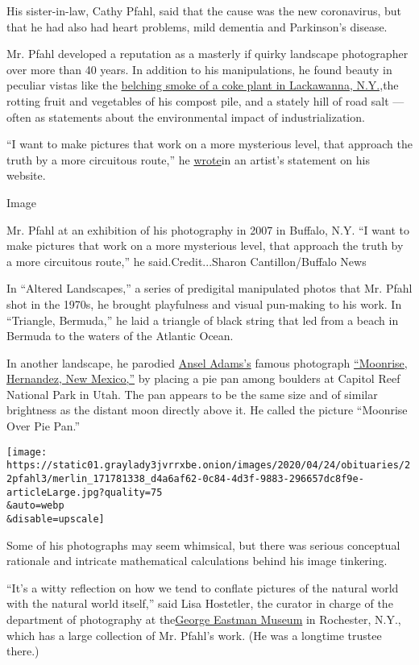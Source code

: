 His sister-in-law, Cathy Pfahl, said that the cause was the new
coronavirus, but that he had also had heart problems, mild dementia and
Parkinson's disease.

Mr. Pfahl developed a reputation as a masterly if quirky landscape
photographer over more than 40 years. In addition to his manipulations,
he found beauty in peculiar vistas like the
\href{https://johnpfahl.com/pages/smoke/S1.html}{belching smoke of a
coke plant in Lackawanna, N.Y.,}the rotting fruit and vegetables of his
compost pile, and a stately hill of road salt --- often as statements
about the environmental impact of industrialization.

``I want to make pictures that work on a more mysterious level, that
approach the truth by a more circuitous route,'' he
\href{https://johnpfahl.com/pages/extras/ArtStatement.html}{wrote}in an
artist's statement on his website.

Image

Mr. Pfahl at an exhibition of his photography in 2007 in Buffalo, N.Y.
``I want to make pictures that work on a more mysterious level, that
approach the truth by a more circuitous route,'' he said.Credit...Sharon
Cantillon/Buffalo News

In ``Altered Landscapes,'' a series of predigital manipulated photos
that Mr. Pfahl shot in the 1970s, he brought playfulness and visual
pun-making to his work. In ``Triangle, Bermuda,'' he laid a triangle of
black string that led from a beach in Bermuda to the waters of the
Atlantic Ocean.

In another landscape, he parodied
\href{https://www.anseladams.com/}{Ansel Adams's} famous photograph
\href{https://www.moma.org/collection/works/53904}{``Moonrise,
Hernandez, New Mexico,''} by placing a pie pan among boulders at Capitol
Reef National Park in Utah. The pan appears to be the same size and of
similar brightness as the distant moon directly above it. He called the
picture ``Moonrise Over Pie Pan.''

\texttt{[image: https://static01.graylady3jvrrxbe.onion/images/2020/04/24/obituaries/22pfahl3/merlin\_171781338\_d4a6af62-0c84-4d3f-9883-296657dc8f9e-articleLarge.jpg?quality=75\\\&auto=webp\\\&disable=upscale]}

Some of his photographs may seem whimsical, but there was serious
conceptual rationale and intricate mathematical calculations behind his
image tinkering.

``It's a witty reflection on how we tend to conflate pictures of the
natural world with the natural world itself,'' said Lisa Hostetler, the
curator in charge of the department of photography at
the\href{https://www.eastman.org/}{George Eastman Museum} in Rochester,
N.Y., which has a large collection of Mr. Pfahl's work. (He was a
longtime trustee there.)

